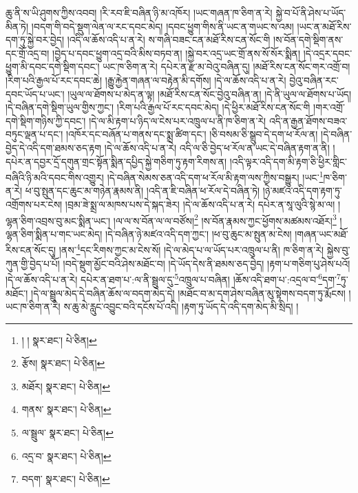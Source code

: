 ཆུ་ནི་ས་ཡི་ཤུགས་ཀྱིས་འབབ། །རི་རབ་ཇི་བཞིན་ཉི་མ་འཁོར། །ཡང་གཞན་ཁ་ཅིག་ན་རེ། སྐྱེ་བ་པོ་ནི་ཤེས་པ་ཡོད་མིན་ཏེ། །བདག་གི་བདེ་སྡུག་ལེན་ལ་རང་དབང་མེད། །དབང་ཕྱུག་གིས་ནི་ཡང་ན་གཡང་ས་འམ། །ཡང་ན་མཐོ་རིས་དག་ཏུ་སྐྱེ་བར་བྱེད། །འདི་ལ་ཆོས་འདི་པ་ན་རེ། ས་གཞི་བཟང་ངན་མཐོ་རིས་ངན་སོང་གི །ས་བོན་དགེ་སྡིག་ནས་དང་གྲོ་འདྲ་བ། །བྱེད་པ་དབང་ཕྱུག་འདྲ་བའི་མིས་བཏབ་ན། །སྐྱེ་བར་འདྲ་ཡང་གྲོ་ནས་སོ་སོར་སྨིན། །དེ་འདྲར་དབང་ཕྱུག་མི་དབང་དགེ་སྡིག་དབང་། ཡང་ཁ་ཅིག་ན་རེ། དཔེར་ན་རྫ་མ་བེའུ་བཞིན་དུ། །མཐོ་རིས་ངན་སོང་གར་འགྲོ་བ། །རིག་པའི་རྒྱལ་པོ་རང་དབང་ཆེ། །རྒྱུ་རྐྱེན་གཞན་ལ་བརྟེན་མི་དགོས། །དེ་ལ་ཆོས་འདི་པ་ན་རེ། བྱེའུ་བཞིན་རང་དབང་ཡོད་པ་ཡང་། །ཡུལ་ལ་ཐོགས་པ་མེད་ན་ལྟ། །མཐོ་རིས་ངན་སོང་བྱེའུ་བཞིན་ན། །དེ་ནི་ཡུལ་ལ་ཐོགས་པ་ཡོད། །དེ་བཞིན་དགེ་སྡིག་ཡུལ་གྱིས་ཀྱང་། །རིག་པའི་རྒྱལ་པོ་རང་དབང་མེད། །དེ་ཕྱིར་མཐོ་རིས་ངན་སོང་གི །གར་འགྲོ་དགེ་སྡིག་གཉིས་ཀྱི་དབང་། །དེ་ལ་མི་རྟག་པ་ཉིད་ལ་ངེས་པར་འཁྲུལ་པ་ནི་ཁ་ཅིག་ན་རེ། འདི་ན་རྒྱན་ཐོགས་བཟའ་བཏུང་ལྡན་པ་དང་། །འཁོར་དང་བཞོན་པ་གནས་དང་སྨྲ་ཚིག་དང་། །ཅི་བསམ་ཅི་སྒྲུབ་དེ་དག་ཕ་རོལ་ན། །དེ་བཞིན་བྱེད་དེ་འདི་དག་ཐམས་ཅད་རྟག །དེ་ལ་ཆོས་འདི་པ་ན་རེ། འདི་ལ་ཅི་བྱེད་ཕ་རོལ་ན་ཡང་དེ་བཞིན་རྟག་ན་ནི། །དཔེར་ན་དབྱར་དྲོ་དགུན་གྲང་སྟོན་སྨིན་དཔྱིད་སྐྱེ་གཅིག་ཏུ་རྟག་རིགས་ན། །འདི་ལྟར་འདི་དག་མི་རྟག་ཅི་ཕྱིར་གླིང་བཞིའི་ཉི་མའི་དབང་གིས་འགྱུར། །དེ་བཞིན་སེམས་ཅན་འདི་དག་ཕ་རོལ་མི་རྟག་ལས་ཀྱིས་བསྒྱུར། །ཡང་\footnote{། །  སྣར་ཐང་།  པེ་ཅིན། }ཁ་ཅིག་ན་རེ། ཕ་བུ་སྤུན་དང་ཆུང་མ་གཉེན་རྣམས་ནི། །འདི་ན་ཇི་བཞིན་ཕ་རོལ་དེ་བཞིན་ཏེ། །ཉེ་མཛའ་འདི་དག་རྟག་ཏུ་འགྲོགས་པར་ངེས། །བྲམ་ཟེ་སྨྲ་ལ་མཁས་པས་དེ་སྐད་ཟེར། །དེ་ལ་ཆོས་འདི་པ་ན་རེ། དཔེར་ན་སཱ་ལུའི་སྙེ་མ་ལ། །ལྷན་ཅིག་འབྲས་བུ་མང་སྨིན་ཡང་། །ལ་ལ་ས་བོན་ལ་ལ་བཙོས།\footnote{རྩོས།  སྣར་ཐང་།  པེ་ཅིན། } །ས་བོན་རྣམས་ཀྱང་ཕྱོགས་མཚམས་འཐོར།\footnote{མཐོར།  སྣར་ཐང་།  པེ་ཅིན། } །ལྷན་ཅིག་སྨིན་པ་གང་ཡང་མེད། །དེ་བཞིན་ཉེ་མཛའ་འདི་དག་ཀྱང་། །ཕ་བུ་ཆུང་མ་སྤུན་མ་ངེས། །གཞན་ཡང་མཐོ་རིས་ངན་སོང་དུ། །ནས་\footnote{གནས་  སྣར་ཐང་།  པེ་ཅིན། }དང་རིགས་ཀྱང་མ་ངེས་སོ། །དེ་ལ་མེད་པ་ལ་ཡོད་པར་འཁྲུལ་པ་ནི། ཁ་ཅིག་ན་རེ། སྐྱེས་བུ་ཀུན་གྱི་བྱེད་པ་པོ། །བདེ་སྡུག་མྱོང་བའི་ཤེས་མཐོང་བ། །དེ་ཡོད་དེས་ནི་ཐམས་ཅད་བྱེད། །རྟག་པ་གཅིག་པུ་ཤེས་པའོ། །དེ་ལ་ཆོས་འདི་པ་ན་རེ། དཔེར་ན་ཐག་པ་:ལ་ནི་སྦྲུལ་དུ་\footnote{ལ་སྦྲུལ་  སྣར་ཐང་།  པེ་ཅིན། }འཁྲུལ་པ་བཞིན། །ཆོས་འདི་ཐག་པ་:འདྲལ་བ་\footnote{འདྲ་བ་  སྣར་ཐང་།  པེ་ཅིན། }དག་\footnote{བདག་  སྣར་ཐང་།  པེ་ཅིན། }ཏུ་མཐོང་། །དེ་ལ་སྦྲུལ་མེད་དེ་བཞིན་ཆོས་ལ་བདག་མེད་དེ། །མཐོང་བ་མ་དག་ཤེས་བཞིན་མུ་སྟེགས་བདག་ཏུ་རྨོངས། །ཡང་ཁ་ཅིག་ན་རེ། ས་ཆུ་མེ་རླུང་འབྱུང་བའི་དངོས་པོ་འདི། །རྟག་ཏུ་ཡོད་དེ་འདི་དག་མེད་མི་སྲིད། །
